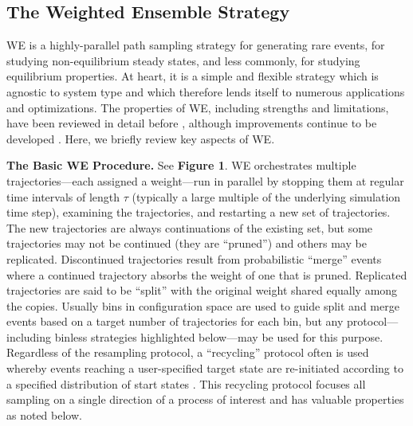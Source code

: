 \subsection{The Weighted Ensemble Strategy}

WE is a highly-parallel path sampling strategy for generating rare events, for studying non-equilibrium steady states, and less commonly, for studying equilibrium properties. 
At heart, it is a simple and flexible strategy which is agnostic to system type and which therefore lends itself to numerous applications and optimizations. 
The properties of WE, including strengths and limitations, have been reviewed in detail before \citep{zuckerman_weighted_2017}, although improvements continue to be developed \citep{donyapour_revo_2019, copperman_accelerated_2020, torrillo_minimal_2021, degrave_red_2021, aristoff_optimizing_2020}. 
Here, we briefly review key aspects of WE.

\textbf{The Basic WE Procedure.} See \textbf{Figure 1}. 
WE orchestrates multiple trajectories---each assigned a weight---run in parallel by stopping them at regular time intervals of length $\tau$ (typically a large multiple of the underlying simulation time step), examining the trajectories, and restarting a new set of trajectories. 
The new trajectories are always continuations of the existing set, but some trajectories may not be continued (they are “pruned”) and others may be replicated. 
Discontinued trajectories result from probabilistic “merge” events where a continued trajectory absorbs the weight of one that is pruned. 
Replicated trajectories are said to be “split” with the original weight shared equally among the copies. 
Usually bins in configuration space are used to guide split and merge events based on a target number of trajectories for each bin, but any protocol---including binless strategies highlighted below---may be used for this purpose.
Regardless of the resampling protocol, a “recycling” protocol often is used whereby events reaching a user-specified target state are re-initiated according to a specified distribution of start states \citep{bhatt_steady-state_2010}.
This recycling protocol focuses all sampling on a single direction of a process of interest and has valuable properties as noted below.

